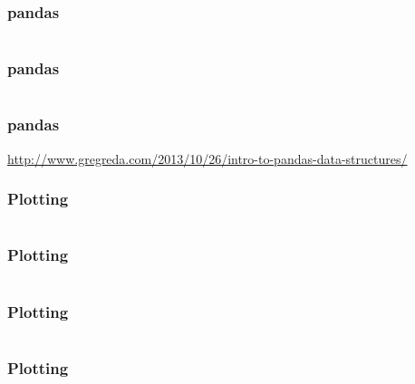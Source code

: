 \documentclass{formation}
\begin{document}
\begin{frame}
  \frametitle{pandas}
  \inputminted[linenos,fontsize=\small]{python}{pandas_6.py}
\end{frame}

\begin{frame}
  \frametitle{pandas}
  \inputminted[linenos,fontsize=\small]{python}{pandas_7.py}
\end{frame}

\begin{frame}
  \frametitle{pandas}
    \vspace{5mm}
    \url{http://www.gregreda.com/2013/10/26/intro-to-pandas-data-structures/}
\end{frame}

\begin{frame}
  \frametitle{Plotting}
  \begin{minipage}[c]{0.49\linewidth}
    \inputminted[linenos,fontsize=\small]{python}{pyplot_1.py}
  \end{minipage}\hfill
  \begin{minipage}[c]{0.49\linewidth}
  \end{minipage}\hfill
\end{frame}

\begin{frame}
  \frametitle{Plotting}
  \begin{minipage}[c]{0.55\linewidth}
    \inputminted[linenos,fontsize=\small]{python}{pyplot_2.py}
  \end{minipage}\hfill
  \begin{minipage}[c]{0.43\linewidth}
  \end{minipage}\hfill
\end{frame}

\begin{frame}
  \frametitle{Plotting}
  \inputminted[linenos,fontsize=\small]{python}{pyplot_3.py}
  \vspace{-55mm}
\end{frame}

\begin{frame}
  \frametitle{Plotting}
  \inputminted[linenos,fontsize=\small]{python}{pyplot_4.py}
\end{frame}
\end{document}
